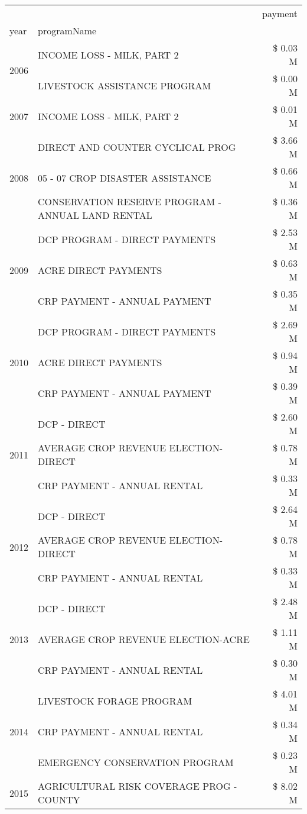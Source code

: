 \begin{tabular}{llr}
\toprule
 &  & payment \\
year & programName &  \\
\midrule
\multirow[t]{2}{*}{2006} & INCOME LOSS - MILK, PART 2 & \$ 0.03 M \\
 & LIVESTOCK ASSISTANCE PROGRAM & \$ 0.00 M \\
\cline{1-3}
2007 & INCOME LOSS - MILK, PART 2 & \$ 0.01 M \\
\cline{1-3}
\multirow[t]{3}{*}{2008} & DIRECT AND COUNTER CYCLICAL PROG & \$ 3.66 M \\
 & 05 - 07 CROP DISASTER ASSISTANCE & \$ 0.66 M \\
 & CONSERVATION RESERVE PROGRAM - ANNUAL LAND RENTAL & \$ 0.36 M \\
\cline{1-3}
\multirow[t]{3}{*}{2009} & DCP PROGRAM - DIRECT PAYMENTS & \$ 2.53 M \\
 & ACRE DIRECT PAYMENTS & \$ 0.63 M \\
 & CRP PAYMENT - ANNUAL PAYMENT & \$ 0.35 M \\
\cline{1-3}
\multirow[t]{3}{*}{2010} & DCP PROGRAM - DIRECT PAYMENTS & \$ 2.69 M \\
 & ACRE DIRECT PAYMENTS & \$ 0.94 M \\
 & CRP PAYMENT - ANNUAL PAYMENT & \$ 0.39 M \\
\cline{1-3}
\multirow[t]{3}{*}{2011} & DCP - DIRECT & \$ 2.60 M \\
 & AVERAGE CROP REVENUE ELECTION-DIRECT & \$ 0.78 M \\
 & CRP PAYMENT - ANNUAL RENTAL & \$ 0.33 M \\
\cline{1-3}
\multirow[t]{3}{*}{2012} & DCP - DIRECT & \$ 2.64 M \\
 & AVERAGE CROP REVENUE ELECTION-DIRECT & \$ 0.78 M \\
 & CRP PAYMENT - ANNUAL RENTAL & \$ 0.33 M \\
\cline{1-3}
\multirow[t]{3}{*}{2013} & DCP - DIRECT & \$ 2.48 M \\
 & AVERAGE CROP REVENUE ELECTION-ACRE & \$ 1.11 M \\
 & CRP PAYMENT - ANNUAL RENTAL & \$ 0.30 M \\
\cline{1-3}
\multirow[t]{3}{*}{2014} & LIVESTOCK FORAGE PROGRAM & \$ 4.01 M \\
 & CRP PAYMENT - ANNUAL RENTAL & \$ 0.34 M \\
 & EMERGENCY CONSERVATION PROGRAM & \$ 0.23 M \\
\cline{1-3}
\multirow[t]{3}{*}{2015} & AGRICULTURAL RISK COVERAGE PROG - COUNTY & \$ 8.02 M \\

\end{tabular}
